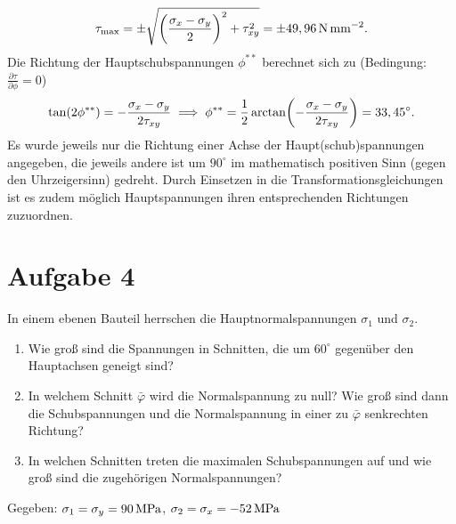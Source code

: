 \documentclass{exercise}
\begin{document}
\begin{enumerate}
        \[
            \tau_{\text{max}} = \pm\sqrt{\parentheses*{\frac{\sigma_x - \sigma_y}{2}}^2 + \tau_{xy}^2} = \pm 49,96\sis{\newton\per\milli\meter\squared}.
        \]
        Die Richtung der Hauptschubspannungen \(\phi^{**}\) berechnet sich zu (Bedingung: \(\frac{\partial\tau}{\partial\phi} = 0\))
        \[
            \tan\parentheses*{2\phi^{**}} = -\frac{\sigma_x - \sigma_y}{2\tau_{xy}} \implies \phi^{**} = \frac{1}{2}\arctan\parentheses*{-\frac{\sigma_x - \sigma_y}{2\tau_{xy}}} = 33,45^\circ.
        \]
        Es wurde jeweils nur die Richtung einer Achse der Haupt(schub)spannungen angegeben, die jeweils andere ist um \(90^\circ\) im mathematisch positiven Sinn (gegen den Uhrzeigersinn) gedreht.
        Durch Einsetzen in die Transformationsgleichungen ist es zudem möglich Hauptspannungen ihren entsprechenden Richtungen zuzuordnen.
    \end{enumerate}

    
    \section*{Aufgabe 4}

    \begin{problem}
        In einem ebenen Bauteil herrschen die Hauptnormalspannungen \(\sigma_1\) und \(\sigma_2\).
        \begin{enumerate}
            \item Wie groß sind die Spannungen in Schnitten, die um \(60^\circ\) gegenüber den Hauptachsen geneigt sind?
            \item In welchem Schnitt \(\bar{\varphi}\) wird die Normalspannung zu null?
            Wie groß sind dann die Schubspannungen und die Normalspannung in einer zu \(\bar{\varphi}\) senkrechten Richtung?
            \item In welchen Schnitten treten die maximalen Schubspannungen auf und wie groß sind die zugehörigen Normalspannungen?
        \end{enumerate}
        Gegeben: \(\sigma_1 = \sigma_y = 90\sis{\mega\pascal}\), \(\sigma_2 = \sigma_x = -52\sis{\mega\pascal}\)
    \end{problem}
\end{document}
